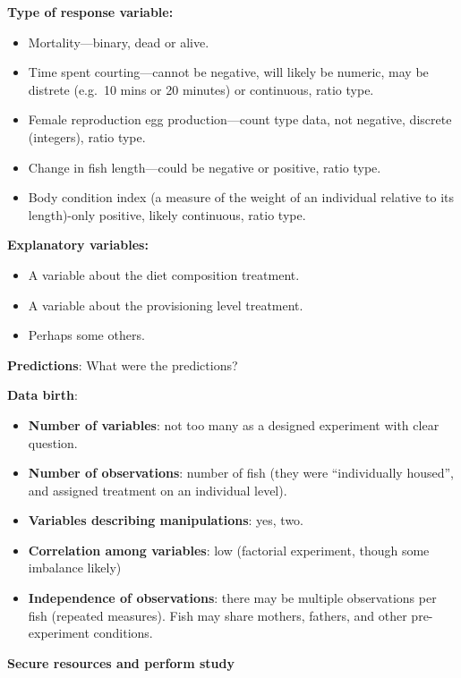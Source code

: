 \documentclass[]{book}
\providecommand{\tightlist}{%
  \setlength{\itemsep}{0pt}\setlength{\parskip}{0pt}}
\begin{document}
\textbf{Type of response variable:}

\begin{itemize}
\tightlist
\item
  Mortality---binary, dead or alive.
\item
  Time spent courting---cannot be negative, will likely be numeric, may be distrete (e.g.~10 mins or 20 minutes) or continuous, ratio type.
\item
  Female reproduction egg production---count type data, not negative, discrete (integers), ratio type.
\item
  Change in fish length---could be negative or positive, ratio type.
\item
  Body condition index (a measure of the weight of an individual relative to its length)-only positive, likely continuous, ratio type.
\end{itemize}

\textbf{Explanatory variables:}

\begin{itemize}
\tightlist
\item
  A variable about the diet composition treatment.
\item
  A variable about the provisioning level treatment.
\item
  Perhaps some others.
\end{itemize}

\textbf{Predictions}:
What were the predictions?

\textbf{Data birth}:

\begin{itemize}
\tightlist
\item
  \textbf{Number of variables}: not too many as a designed experiment with clear question.
\item
  \textbf{Number of observations}: number of fish (they were ``individually housed'', and assigned treatment on an individual level).
\item
  \textbf{Variables describing manipulations}: yes, two.
\item
  \textbf{Correlation among variables}: low (factorial experiment, though some imbalance likely)
\item
  \textbf{Independence of observations}: there may be multiple observations per fish (repeated measures). Fish may share mothers, fathers, and other pre-experiment conditions.
\end{itemize}

\textbf{Secure resources and perform study}
\end{document}
